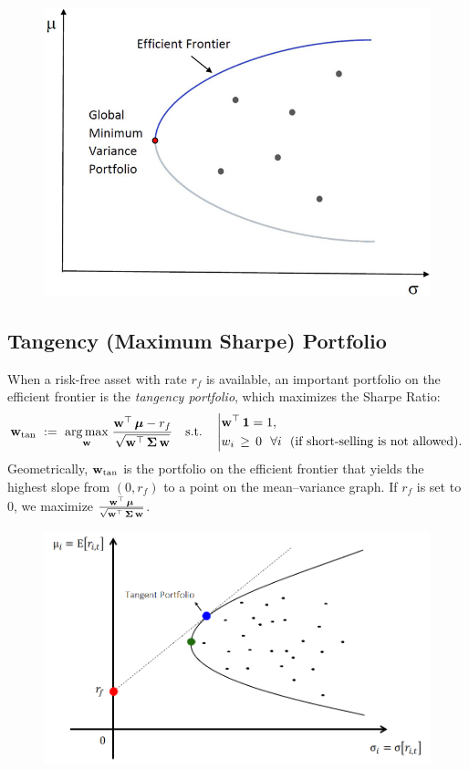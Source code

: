 \begin{figure}[H]
  \centering
  \includegraphics[scale=0.4]{GMV.jpg}
\end{figure}


\subsection{Tangency (Maximum Sharpe) Portfolio}
When a risk-free asset with rate $r_f$ is available, an important portfolio on the efficient frontier is the \emph{tangency portfolio}, which maximizes the Sharpe Ratio:
\[
\mathbf w_{\mathrm{tan}}
~:=~
\underset{\mathbf w}{\arg \max}
\;
\frac{\mathbf w^\top \,\boldsymbol \mu - r_f}{\sqrt{\mathbf w^\top \,\mathbf \Sigma \,\mathbf w}}
\quad
\text{s.t.}
\quad
\left|
\begin{aligned}
& \mathbf w^\top \,\mathbf 1 = 1, \\
& w_i \,\ge\, 0~~\forall i ~~(\text{if short-selling is not allowed}).
\end{aligned}
\right.
\]
Geometrically, $\mathbf w_{\mathrm{tan}}$ is the portfolio on the efficient frontier that yields the highest slope from $(0,r_f)$ to a point on the mean--variance graph. If $r_f$ is set to $0$, we maximize $\frac{\mathbf w^\top \,\boldsymbol \mu}{\sqrt{\mathbf w^\top \,\mathbf \Sigma \,\mathbf w}}$.  

\begin{figure}[H]
  \centering
  \includegraphics[scale=0.4]{tangency_portfolio.png}
\end{figure}


